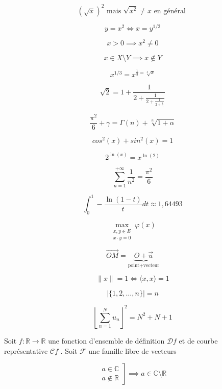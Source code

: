 \documentclass[12pt,a4paper]{scrartcl}
\theoremstyle{plain}
\begin{document}
\begin{equation*}
 (\sqrt{x})^2 \text{ mais } \sqrt{x^2} \neq x \text{ en général }
\end{equation*}

\begin{equation*}
	y = x^2 \iff x = y^{1/2}
\end{equation*}

\begin{equation*}
	x > 0 \implies x^2 \neq 0
\end{equation*}

\begin{equation*}
	x \in X \setminus Y \implies x \not \in Y
\end{equation*}

\begin{equation*}
	x^{1/3} = x^{\frac{1}{3} = \sqrt[3]{x}}
\end{equation*}

\begin{equation*}
	\sqrt{2} = 1 + \frac{1}{2+\frac{1}{2+\frac{1}{2+\frac{1}{\ddots}}}}
\end{equation*}

\[
	\frac{\pi^2}{6}+\gamma = \Gamma(n) + \sqrt[n]{1+\alpha}
\]

\[
	cos^2(x) + sin^2(x) = 1
\]

\[
	2^{\ln(x)} = x^{\ln(2)}
\]

\[
	\sum_{n=1}^{+\infty}\frac{1}{n^2} = \frac{\pi^2}{6}
\]

\[
	\int_{0}^{1}-\frac{\ln(1-t)}{t}dt \approx 1,64493
\]

\[
\max_{ \substack{x,y \in E \\x \cdot y=0}}\varphi(x)
\]

\[
	\overrightarrow{OM} = \underbrace{O+\vec{u}}_{\text{point+vecteur}}
\]

\[
	\lVert x\rVert = 1 \iff \langle x,x \rangle = 1
\]

\[
	\lvert \{1,2,\dots,n\}\rvert = n
\]

\[
	\left\lfloor \sum_{n=1}^{N} u_n \right\rfloor^2 = N^2+N+1
\]

Soit $f : \mathbb{R} \to \mathbb{R}$ une fonction d’ensemble de définition $\mathcal{D}f$ et de courbe représentative $\mathcal{C}f$ .
Soit $\mathcal{F}$ une famille libre de vecteurs

\[
	\left.\begin{array}{c}
		a \in \mathbb{C} \\
		a \not \in \mathbb{R}
	\end{array}\right]
	\implies a \in \mathbb{C} \setminus \mathbb{R}
\]
\end{document}
